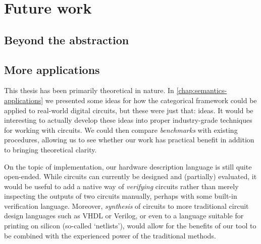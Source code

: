 \section{Future work}

\subsection{Beyond the abstraction}



\subsection{More applications}

This thesis has been primarily theoretical in nature.
In \cref{chap:semantics-applications} we presented some ideas for how
the categorical framework could be applied to real-world digital circuits, but
these were just that: ideas.
It would be interesting to actually develop these ideas into proper
industry-grade techniques for working with circuits.
We could then compare \emph{benchmarks} with existing procedures, allowing us to
see whether our work has practical benefit in addition to bringing theoretical
clarity.

On the topic of implementation, our hardware description language is still
quite open-ended.
While circuits can currently be designed and (partially) evaluated, it would be
useful to add a native way of \emph{verifying} circuits rather than merely
inspecting the outputs of two circuits manually, perhaps with some built-in
verification language.
Moreover, \emph{synthesis} of circuits to more traditional circuit design
languages such as VHDL or Verilog, or even to a language suitable for printing
on silicon (so-called `netlists'), would allow for the benefits of our tool to
be combined with the experienced power of the traditional methods.